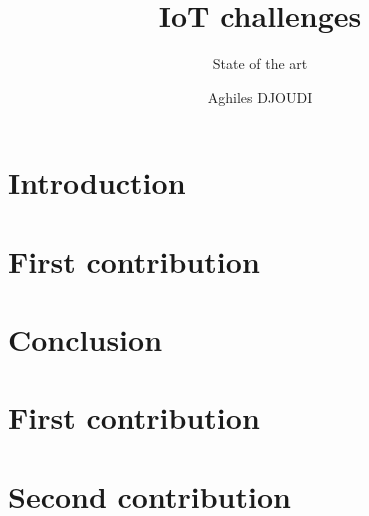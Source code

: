 \documentclass[8pt]{beamer}
\title{IoT challenges}
\subtitle{State of the art}
\author{Aghiles DJOUDI}
\institute{PhD student\\ LIGM/ESIEE Paris \& SIC/ECE Paris}
\begin{document}
\firstpage

\section{Introduction}
	

\tableofcontent

\section{First contribution}
	
	
	
	
	

% 		
% 		
% 		
% 		
% 		

%		
%		
%		
%		
%		

\section{Conclusion}
	


\section{First contribution}
	
	
	
	
	
	

\section{Second contribution}
	
	
	
	
	
	

%		
%		
%		
%		
%		



\frameBibliography
\end{document}
